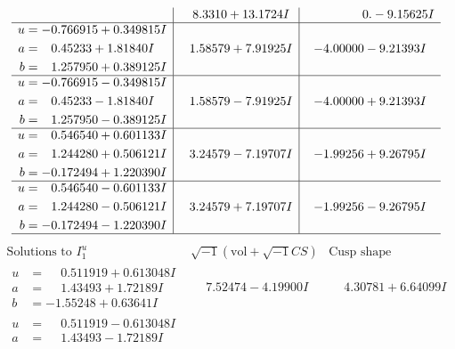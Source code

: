 \documentclass[1p]{elsarticle_modified}
\theoremstyle{definition}
\newcommand{\I}{\sqrt{-1}}
\begin{document}
$$\begin{array}{c|c|c}
 & \phantom{-}8.3310 + 13.1724 I & \phantom{-0.000000 } 0. - 9.15625 I \\ \hline\begin{aligned}
u &= -0.766915 + 0.349815 I \\
a &= \phantom{-}0.45233 + 1.81840 I \\
b &= \phantom{-}1.257950 + 0.389125 I\end{aligned}
 & \phantom{-}1.58579 + 7.91925 I & -4.00000 - 9.21393 I \\ \hline\begin{aligned}
u &= -0.766915 - 0.349815 I \\
a &= \phantom{-}0.45233 - 1.81840 I \\
b &= \phantom{-}1.257950 - 0.389125 I\end{aligned}
 & \phantom{-}1.58579 - 7.91925 I & -4.00000 + 9.21393 I \\ \hline\begin{aligned}
u &= \phantom{-}0.546540 + 0.601133 I \\
a &= \phantom{-}1.244280 + 0.506121 I \\
b &= -0.172494 + 1.220390 I\end{aligned}
 & \phantom{-}3.24579 - 7.19707 I & -1.99256 + 9.26795 I \\ \hline\begin{aligned}
u &= \phantom{-}0.546540 - 0.601133 I \\
a &= \phantom{-}1.244280 - 0.506121 I \\
b &= -0.172494 - 1.220390 I\end{aligned}
 & \phantom{-}3.24579 + 7.19707 I & -1.99256 - 9.26795 I\\
 \hline 
 \end{array}$$\newpage$$\begin{array}{c|c|c}  
\text{Solutions to }I^u_{1}& \I (\text{vol} + \sqrt{-1}CS) & \text{Cusp shape}\\
 \hline 
\begin{aligned}
u &= \phantom{-}0.511919 + 0.613048 I \\
a &= \phantom{-}1.43493 + 1.72189 I \\
b &= -1.55248 + 0.63641 I\end{aligned}
 & \phantom{-}7.52474 - 4.19900 I & \phantom{-}4.30781 + 6.64099 I \\ \hline\begin{aligned}
u &= \phantom{-}0.511919 - 0.613048 I \\
a &= \phantom{-}1.43493 - 1.72189 I \\

\end{aligned}
\end{array}$$
\end{document}
